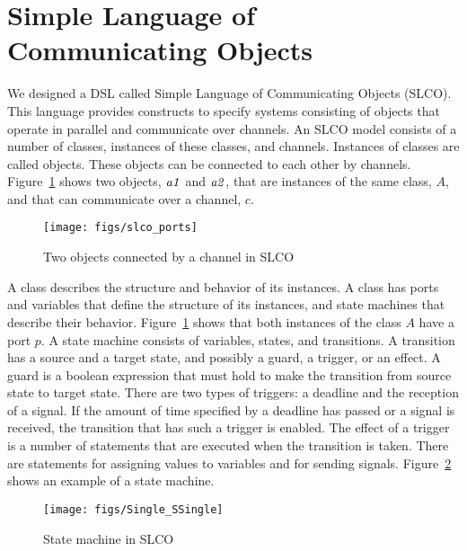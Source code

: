 \section{Simple Language of Communicating Objects}\label{sec:SLCO}
We designed a DSL called Simple Language of Communicating Objects (SLCO).
This language provides constructs to specify systems consisting of objects that operate in parallel and communicate over channels.
An SLCO model consists of a number of classes, instances of these classes, and channels.
Instances of classes are called objects.
These objects can be connected to each other by channels. Figure~\ref{fig:slco_ports_example} shows two objects, $\it{a1}$ and $\it{a2}$, that are instances of the same class, $A$, and that can communicate over a channel, $c$.

\begin{figure}[hbt]
 \centering
 \texttt{[image: figs/slco\_ports]}
 \caption{Two objects connected by a channel in SLCO}
 \label{fig:slco_ports_example}
\end{figure}

A class describes the structure and behavior of its instances.
A class has ports and variables that define the structure of its instances, and state machines that describe their behavior.
Figure~\ref{fig:slco_ports_example} shows that both instances of the class $A$ have a port $p$.
A state machine consists of variables, states, and transitions.
A transition has a source and a target state, and possibly a guard, a trigger, or an effect.
A guard is a boolean expression that must hold to make the transition from source state to target state.
There are two types of triggers: a deadline and the reception of a signal.
If the amount of time specified by a deadline has passed or a signal is received, the transition that has such a trigger is enabled.
The effect of a trigger is a number of statements that are executed when the transition is taken.
There are statements for assigning values to variables and for sending signals.
Figure~\ref{fig:slco_sm_example} shows an example of a state machine.

\begin{figure}[hbt]
 \centering
 \texttt{[image: figs/Single\_SSingle]}
 \caption{State machine in SLCO}
 \label{fig:slco_sm_example}
\end{figure}

